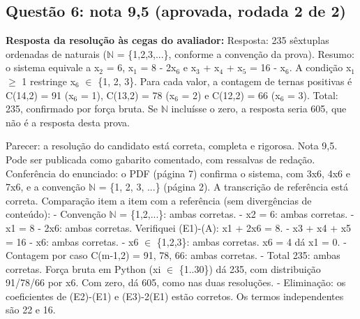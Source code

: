 \documentclass{article}%
\begin{document}
\subsection*{Questão 6: nota 9,5 (aprovada, rodada 2 de 2)}%
\textbf{Resposta da resolução às cegas do avaliador:} Resposta: 235 sêxtuplas ordenadas de naturais ($\mathbb{N}$ = \{1,2,3,...\}, conforme a convenção da prova).\newline%
\newline%
Resumo: o sistema equivale a x$_{2}$ = 6, x$_{1}$ = 8 - 2x$_{6}$ e x$_{3}$ + x$_{4}$ + x$_{5}$ = 16 - x$_{6}$. A condição x$_{1}$ $\geq$ 1 restringe x$_{6}$ $\in$ \{1, 2, 3\}. Para cada valor, a contagem de ternas positivas é C(14,2) = 91 (x$_{6}$ = 1), C(13,2) = 78 (x$_{6}$ = 2) e C(12,2) = 66 (x$_{6}$ = 3). Total: 235, confirmado por força bruta. Se $\mathbb{N}$ incluísse o zero, a resposta seria 605, que não é a resposta desta prova.\par %
Parecer: a resolução do candidato está correta, completa e rigorosa. Nota 9,5. Pode ser publicada como gabarito comentado, com ressalvas de redação.\newline%
\newline%
Conferência do enunciado: o PDF (página 7) confirma o sistema, com 3x6, 4x6 e 7x6, e a convenção $\mathbb{N}$ = \{1, 2, 3, ...\} (página 2). A transcrição de referência está correta.\newline%
\newline%
Comparação item a item com a referência (sem divergências de conteúdo):\newline%
{-} Convenção $\mathbb{N}$ = \{1,2,...\}: ambas corretas.\newline%
{-} x2 = 6: ambas corretas.\newline%
{-} x1 = 8 - 2x6: ambas corretas. Verifiquei (E1)-(A): x1 + 2x6 = 8.\newline%
{-} x3 + x4 + x5 = 16 - x6: ambas corretas.\newline%
{-} x6 $\in$ \{1,2,3\}: ambas corretas. x6 = 4 dá x1 = 0.\newline%
{-} Contagem por caso C(m-1,2) = 91, 78, 66: ambas corretas.\newline%
{-} Total 235: ambas corretas. Força bruta em Python (xi $\in$ \{1..30\}) dá 235, com distribuição 91/78/66 por x6. Com zero, dá 605, como nas duas resoluções.\newline%
{-} Eliminação: os coeficientes de (E2)-(E1) e (E3)-2(E1) estão corretos. Os termos independentes são 22 e 16.\newline%
\end{document}
